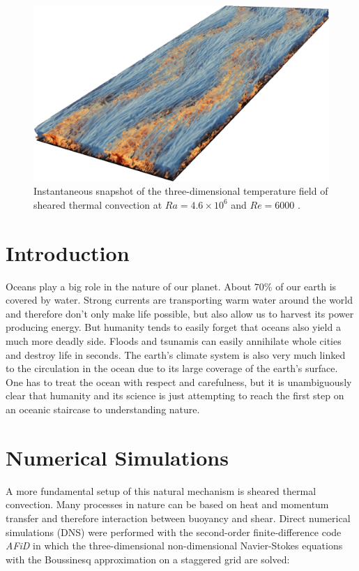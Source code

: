 \documentclass[final,5p,times,twocolumn]{elsarticle}
\begin{document}

\begin{figure}[!hbt]
	\centering
	\includegraphics[width=\linewidth]{flowfield}%
	\caption{\label{fig:flowfield} Instantaneous snapshot of the three-dimensional temperature field of sheared thermal convection at $ Ra=4.6 \times 10^6 $ and $ Re=6000 $ \cite{bla18}.}
\end{figure}

\section{Introduction}
\label{sec:Introduction}

Oceans play a big role in the nature of our planet. About $ 70 \% $ of our earth
is covered by water. Strong currents are transporting warm water around the world
and therefore don't only make life possible, but also allow us to harvest its
power producing energy. But humanity tends to easily forget that oceans also
yield a much more deadly side. Floods and tsunamis can easily annihilate whole
cities and destroy life in seconds. The earth's climate system is also very much
linked to the circulation in the ocean due to its large coverage of the earth's surface.
One has to treat the ocean with respect and carefulness, but it is unambiguously
clear that humanity and its science is just attempting to reach the first step on
an oceanic staircase to understanding nature.

\section{Numerical Simulations}

A more fundamental setup of this natural mechanism is sheared thermal convection.
Many processes in nature can be based on heat and momentum
transfer and therefore interaction between buoyancy and shear. Direct
numerical simulations (DNS) were performed with the second-order finite-difference
code \textit{AFiD} \cite{poe15c} in which the three-dimensional non-dimensional
Navier-Stokes equations with the Boussinesq approximation on a staggered grid are solved:
\end{document}
